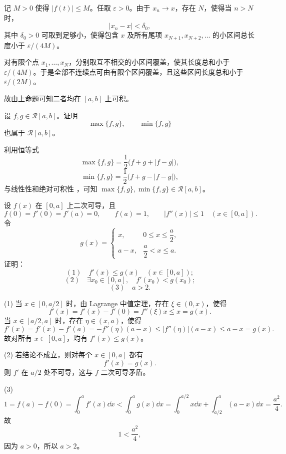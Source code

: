 \begin{solution}
	记 $M>0$ 使得 $|f(t)|\leq M$。任取 $\varepsilon>0$。由于 $x_n\to x$，存在 $N$，使得当 $n>N$ 时，
	\[
	|x_n-x|<\delta_0,
	\]
	其中 $\delta_0>0$ 可取到足够小，使得包含 $x$ 及所有尾项 $x_{N+1},x_{N+2},\ldots$ 的小区间总长度小于 $\varepsilon/(4M)$。
	
	对有限个点 $x_1,\ldots,x_N$，分别取互不相交的小区间覆盖，使其长度总和小于 $\varepsilon/(4M)$。于是全部不连续点可由有限个区间覆盖，且这些区间长度总和小于 $\varepsilon/(2M)$。
	
	故由上命题可知二者均在 $[a,b]$ 上可积。
\end{solution}

\begin{problem}
	设 $f,g\in \mathcal{R}[a,b]$。证明
	\[
	\max\{f,g\},\qquad \min\{f,g\}
	\]
	也属于 $\mathcal{R}[a,b]$。
\end{problem}

\begin{solution}
	利用恒等式
	\[
	\max\{f,g\}=\frac12\bigl(f+g+|f-g|\bigr),
	\]
	\[
	\min\{f,g\}=\frac12\bigl(f+g-|f-g|\bigr),
	\]
	与线性性和绝对可积性 ，可知 $\max\{f,g\},\min\{f,g\}\in  \mathcal{R}[a,b]$。
\end{solution}

\begin{problem}
	设 $f(x)$ 在 $[0,a]$ 上二次可导，且
	\[
	f(0)=f'(0)=f'(a)=0,
	\qquad
	f(a)=1,
	\qquad
	|f''(x)|\leq1\quad (x\in[0,a]).
	\]
	令
	\[
	g(x)=
	\begin{cases}
		x,&0\leq x\leq \dfrac a2,\\[4pt]
		a-x,&\dfrac a2<x\leq a.
	\end{cases}
	\]
	证明：
	\[
	(1)\quad f'(x)\leq g(x)\quad (x\in[0,a]);
	\]
	\[
	(2)\quad \exists x_0\in[0,a],\quad f'(x_0)<g(x_0);
	\]
	\[
	(3)\quad a>2.
	\]
\end{problem}

\begin{solution}
	(1) 当 $x\in[0,a/2]$ 时，由 Lagrange 中值定理，存在 $\xi\in(0,x)$，使得
	\[
	f'(x)=f'(x)-f'(0)=f''(\xi)x\leq x=g(x).
	\]
	当 $x\in[a/2,a]$ 时，存在 $\eta\in(x,a)$，使得
	\[
	f'(x)=f'(x)-f'(a)=-f''(\eta)(a-x)\leq |f''(\eta)|(a-x)\leq a-x=g(x).
	\]
	故对所有 $x\in[0,a]$，均有 $f'(x)\leq g(x)$。
	
	(2) 若结论不成立，则对每个 $x\in[0,a]$ 都有
	\[
	f'(x)=g(x).
	\]
	则 $f'$ 在 $a/2$ 处不可导，这与 $f$ 二次可导矛盾。
	
	(3) \[
	1=f(a)-f(0)=\int_0^a f'(x)\dd x
	<\int_0^a g(x)\dd x=\int_0^{a/2}x\dd x+\int_{a/2}^a(a-x)\dd x
	=\frac{a^2}{4}.
	\]
	故
	\[
	1<\frac{a^2}{4},
	\]
	因为 $a>0$，所以 $a>2$。
\end{solution}

